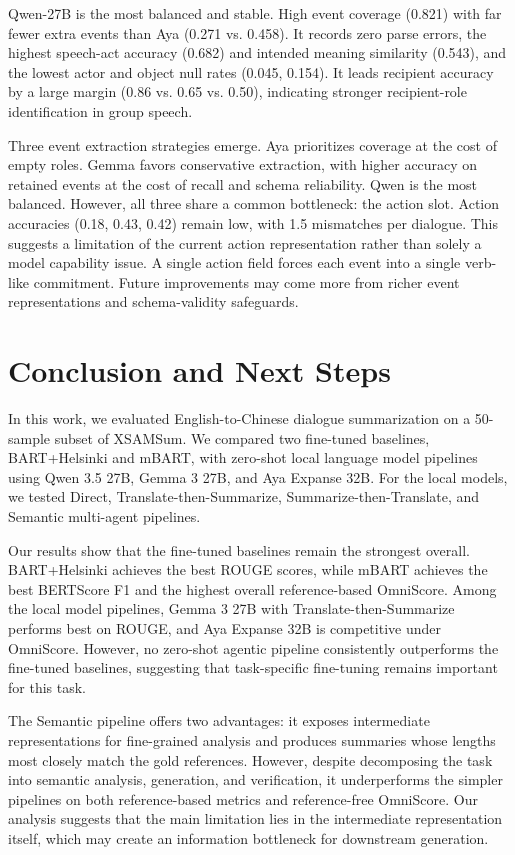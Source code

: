 \documentclass[11pt]{article}
\begin{document}
Qwen-27B is the most balanced and stable. High event coverage (0.821) with far fewer extra events than Aya (0.271 vs. 0.458). It records zero parse errors, the highest speech-act accuracy (0.682) and intended meaning similarity (0.543), and the lowest actor and object null rates (0.045, 0.154). It leads recipient accuracy by a large margin (0.86 vs. 0.65 vs. 0.50), indicating stronger recipient-role identification in group speech.

Three event extraction strategies emerge. Aya prioritizes coverage at the cost of empty roles. Gemma favors conservative extraction, with higher accuracy on retained events at the cost of recall and schema reliability. Qwen is the most balanced. However, all three share a common bottleneck: the action slot. Action accuracies (0.18, 0.43, 0.42) remain low, with 1.5 mismatches per dialogue. This suggests a limitation of the current action representation rather than solely a model capability issue. A single action field forces each event into a single verb-like commitment. Future improvements may come more from richer event representations and schema-validity safeguards.

\section{Conclusion and Next Steps}

In this work, we evaluated English-to-Chinese dialogue summarization on a
50-sample subset of XSAMSum. We compared two fine-tuned baselines,
BART+Helsinki and mBART, with zero-shot local language model pipelines using Qwen 3.5 27B, Gemma 3 27B, and Aya Expanse 32B. For the local models, we tested Direct, Translate-then-Summarize, Summarize-then-Translate, and Semantic multi-agent pipelines.

Our results show that the fine-tuned baselines remain the strongest overall. BART+Helsinki achieves the best ROUGE scores, while mBART achieves the best BERTScore F1 and the highest overall reference-based OmniScore. Among the local model pipelines, Gemma 3 27B with Translate-then-Summarize performs best on ROUGE, and Aya Expanse 32B is competitive under OmniScore. However, no zero-shot agentic pipeline consistently outperforms the fine-tuned baselines, suggesting that task-specific fine-tuning remains important for this task.

The Semantic pipeline offers two advantages: it exposes intermediate representations for fine-grained analysis and produces summaries whose lengths most closely match the gold references. However, despite decomposing the task into semantic analysis, generation, and verification, it underperforms the simpler pipelines on both reference-based metrics and reference-free OmniScore. Our analysis suggests that the main limitation lies in the intermediate representation itself, which may create an information bottleneck for downstream generation.
\end{document}
